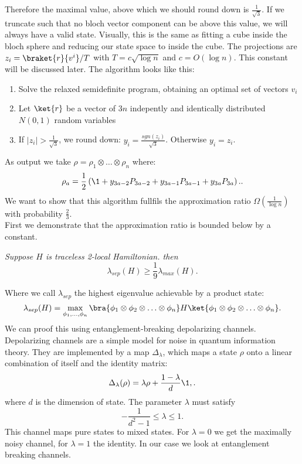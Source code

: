Therefore the maximal value, above which we should round down is $\frac{1}{\sqrt{3}}$.
If we truncate such that no bloch vector component can be above this value, we will always have a valid state.
Visually, this is the same as fitting a cube inside the bloch sphere and reducing our state space to inside the cube.
The projections are $z_i=\braket{r}{v^i}/T$ with $T=c\sqrt{\log{}n}$ and $c=O(\log{}n)$.
This constant will be discussed later.
The algorithm looks like this:
\begin{enumerate}
	\item Solve the relaxed semidefinite program, obtaining an optimal set of vectors $v_i$
	\item Let $\ket{r}$ be a vector of $3n$ indepently and identically distributed $N(0,1)$ random variables
	\item If $|z_i|>\frac{1}{\sqrt{3}}$, we round down: $y_i=\frac{sgn(z_i)}{\sqrt{3}}$. Otherwise $y_i=z_i$.
\end{enumerate}
As output we take $ \rho=\rho_1\otimes\ldots\otimes\rho_n$ where:\[
	\rho_a=\frac{1}{2}\left(\1 +y_{3a-2}P_{3a-2}+y_{3a-1}P_{3a-1}+y_{3a}P_{3a}\right).
.\]
We want to show that this algorithm fullfils the approximation ratio $\Omega(\frac{1}{\log{}n})$ with probability $\frac{2}{3}$.\\
First we demonstrate that the approximation ratio is bounded below by a constant.\cite{lieb73}
\begin{thm}\emph{
	Suppose $H$ is traceless 2-local Hamiltonian. then \[
	\lambda_{sep}(H)\ge \frac{1}{9}\lambda_{max}(H)
.\]}
\end{thm}
Where we call $\lambda_{sep}$ the highest eigenvalue achievable by a product state: \[
	\lambda_{sep}(H)=\max_{\phi_1,\ldots,\phi_n}\bra{\phi_1\otimes\phi_2\otimes\ldots\otimes\phi_n}H\ket{\phi_1\otimes\phi_2\otimes\ldots\otimes\phi_n}
.\]
We can proof this using entanglement-breaking depolarizing channels.
Depolarizing channels are a simple model for noise in quantum information theory. \cite{nielsen11}
They are implemented by a map $\Delta_{\lambda}$, which maps a state  $\rho$ onto a linear combination of itself and the identity matrix:\cite{king02}\[
	\Delta_{\lambda}(\rho)=\lambda\rho+\frac{1-\lambda}{d}\1,
.\]
where $d$ is the dimension of state. The parameter $\lambda$ must satisfy \[
	-\frac{1}{d^2-1}\le\lambda\le 1
.\]
This channel maps pure states to mixed states.
For $\lambda=0$ we get the maximally noisy channel, for $\lambda=1$ the identity.
In our case we look at entanglement breaking channels.
